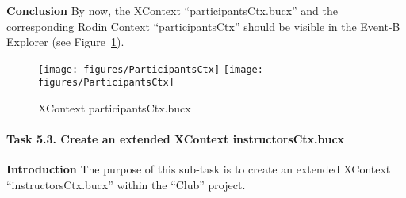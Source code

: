 \textbf{Conclusion} By now, the XContext ``participantsCtx.bucx'' and the corresponding Rodin Context ``participantsCtx'' should be visible in the Event-B Explorer (see Figure~\ref{fig:ParticipantsCtx}).
  \begin{figure}[!htbp]
    \centering
    \texttt{[image: figures/ParticipantsCtx]}
    \else
    \texttt{[image: figures/ParticipantsCtx]}
    \endif
    \caption{XContext participantsCtx.bucx}
    \label{fig:ParticipantsCtx}
  \end{figure}

\paragraph{Task 5.3. Create an extended XContext instructorsCtx.bucx}
\textbf{Introduction} The purpose of this sub-task is to create an extended XContext ``instructorsCtx.bucx'' within the ``Club'' project.
